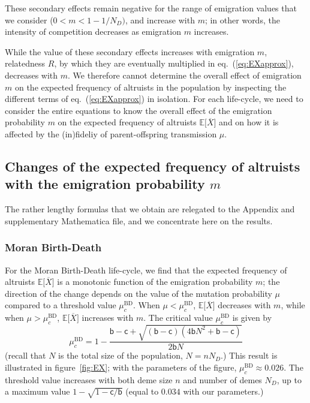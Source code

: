 \documentclass[11pt, letterpaper]{article}
\renewcommand{\eqref}[1]{\textup{{\normalfont eq.~(\ref{#1}}\normalfont)}}
\newcommand{\Esp}[1]{\mathbb{E}\big[ #1\big]}%
\newcommand{\appname}[0]{Appendix}
\newcommand{\bb}{\mathsf{b}}
\newcommand{\cc}{\mathsf{c}}
\newcommand{\BD}{\textrm{BD}}
\newcommand{\ndemes}{N_D}
\begin{document}
These secondary effects remain negative for the range of emigration values that we consider ($0<m<1-1/\ndemes)$, and increase with $m$; in other words, the intensity of competition decreases as emigration $m$ increases.

While the value of these secondary effects increases with emigration $m$, relatedness $R$, by which they are eventually multiplied in \eqref{eq:EXapprox}, decreases with $m$. We therefore cannot determine the overall effect of emigration $m$ on the expected frequency of altruists in the population by inspecting the different terms of \eqref{eq:EXapprox} in isolation. For each life-cycle, we need to consider the entire equations to know the overall effect of the emigration probability $m$ on the expected frequency of altruists $\Esp{\overline{X}}$ and on how it is affected by the (in)fideliy of parent-offspring transmission $\mu$. 
 
\subsection*{Changes of the expected frequency of altruists with the emigration probability $m$} 

The rather lengthy formulas that we obtain are relegated to the \appname{} and supplementary Mathematica file, and we concentrate here on the results. 

\subsubsection*{Moran Birth-Death}

For the Moran Birth-Death life-cycle, we find that the expected frequency of altruists $\Esp{\overline{X}}$ is a monotonic function of the emigration probability $m$; the direction of the change depends on the value of the mutation probability $\mu$ compared to a threshold value $\mu_c^{\BD}$. When $\mu<\mu_c^{\BD}$, $\Esp{\overline{X}}$ decreases with $m$, while when $\mu>\mu_c^{\BD}$, $\Esp{\overline{X}}$  increases with $m$. The critical value $\mu_c^{\BD}$ is given by 
\begin{equation}\label{eq:mucBD}
\mu_c^{\BD} = %
1 - \frac{\bb  - \cc + \sqrt{(\bb - \cc) \left(4 \bb N^2 + \bb - \cc \right)} }{2 \bb N}
\end{equation}
%
(recall that $N$ is the total size of the population, $N=n \ndemes$.) This result is illustrated in figure~\ref{fig:EX}; with the parameters of the figure, $\mu_c^{\BD} \approx 0.026$. The threshold value increases with both deme size $n$ and number of demes $\ndemes$, up to a maximum value $1 - \sqrt{1-\cc/\bb}$ (equal to $0.034$ with our parameters.)
\end{document}
